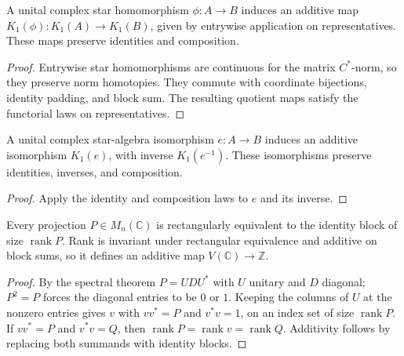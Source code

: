 \begin{proposition}\label{prop:unital-k1-functoriality}
A unital complex star homomorphism $\phi:A\to B$ induces an additive map
$K_1(\phi):K_1(A)\to K_1(B)$, given by entrywise application on representatives.
These maps preserve identities and composition.
\end{proposition}
\begin{proof}
\leanok
Entrywise star homomorphisms are continuous for the matrix $C^*$-norm,
so they preserve norm homotopies. They commute with coordinate bijections,
identity padding, and block sum. The resulting quotient maps satisfy the
functorial laws on representatives.
\end{proof}

\begin{proposition}\label{prop:unital-k1-isomorphism}
A unital complex star-algebra isomorphism $e:A\to B$ induces an additive
isomorphism $K_1(e)$, with inverse $K_1(e^{-1})$. These isomorphisms preserve
identities, inverses, and composition.
\end{proposition}
\begin{proof}
\leanok
Apply the identity and composition laws to $e$ and its inverse.
\end{proof}

\begin{proposition}\label{prop:scalar-projection-rank-classification}
\leanok
Every projection $P\in M_n(\mathbb C)$ is rectangularly equivalent to the
identity block of size $\operatorname{rank}P$. Rank is invariant under
rectangular equivalence and additive on block sums, so it defines an additive
map $V(\mathbb C)\to\mathbb Z$.
\end{proposition}
\begin{proof}
\leanok
By the spectral theorem $P=UDU^*$ with $U$ unitary and $D$ diagonal; $P^2=P$
forces the diagonal entries to be $0$ or $1$. Keeping the columns of $U$ at the
nonzero entries gives $v$ with $vv^*=P$ and $v^*v=1$, on an index set of size
$\operatorname{rank}P$. If $vv^*=P$ and $v^*v=Q$, then
$\operatorname{rank}P=\operatorname{rank}v=\operatorname{rank}Q$. Additivity
follows by replacing both summands with identity blocks.
\end{proof}

